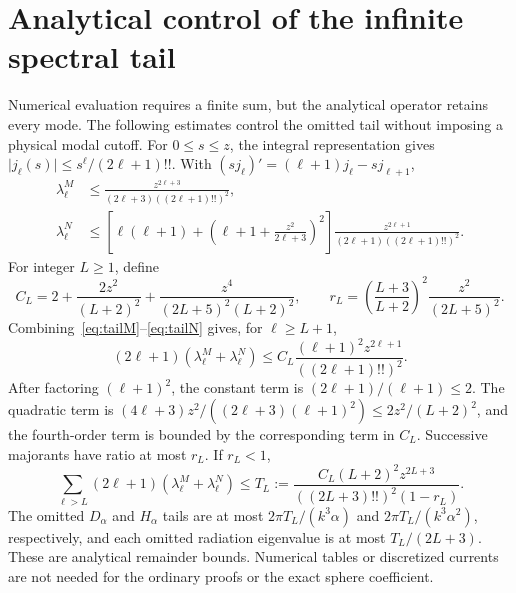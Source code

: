 \documentclass[11pt]{article}
\newcommand{\abs}[1]{\lvert #1\rvert}
\begin{document}
\section{Analytical control of the infinite spectral tail}\label{app:tails}
Numerical evaluation requires a finite sum, but the analytical operator retains every mode. The following estimates control the omitted tail without imposing a physical modal cutoff. For $0\leq s\leq z$, the integral representation gives $\abs{j_\ell(s)}\leq s^\ell/(2\ell+1)!!$. With $(sj_\ell)'=(\ell+1)j_\ell-sj_{\ell+1}$,
\begin{align}
 \lambda^M_\ell&\leq\frac{z^{2\ell+3}}{(2\ell+3)((2\ell+1)!!)^2},\label{eq:tailM}\\
 \lambda^N_\ell&\leq\left[\ell(\ell+1)+
 \left(\ell+1+\frac{z^2}{2\ell+3}\right)^2\right]
 \frac{z^{2\ell+1}}{(2\ell+1)((2\ell+1)!!)^2}.\label{eq:tailN}
\end{align}
For integer $L\geq1$, define
\[
 C_L=2+\frac{2z^2}{(L+2)^2}
       +\frac{z^4}{(2L+5)^2(L+2)^2},\qquad
 r_L=\left(\frac{L+3}{L+2}\right)^2\frac{z^2}{(2L+5)^2}.
\]
Combining~\eqref{eq:tailM}--\eqref{eq:tailN} gives, for $\ell\geq L+1$,
\[
 (2\ell+1)(\lambda^M_\ell+\lambda^N_\ell)
 \leq C_L\frac{(\ell+1)^2z^{2\ell+1}}{((2\ell+1)!!)^2}.
\]
After factoring $(\ell+1)^2$, the constant term is $(2\ell+1)/(\ell+1)\leq2$. The quadratic term is $(4\ell+3)z^2/((2\ell+3)(\ell+1)^2)\leq2z^2/(L+2)^2$, and the fourth-order term is bounded by the corresponding term in $C_L$. Successive majorants have ratio at most $r_L$. If $r_L<1$,
\begin{equation}\label{eq:tail}
 \sum_{\ell>L}(2\ell+1)(\lambda^M_\ell+\lambda^N_\ell)
 \leq T_L:=\frac{C_L(L+2)^2z^{2L+3}}{((2L+3)!!)^2(1-r_L)}.
\end{equation}
The omitted $D_\alpha$ and $H_\alpha$ tails are at most $2\pi T_L/(k^3\alpha)$ and $2\pi T_L/(k^3\alpha^2)$, respectively, and each omitted radiation eigenvalue is at most $T_L/(2L+3)$. These are analytical remainder bounds. Numerical tables or discretized currents are not needed for the ordinary proofs or the exact sphere coefficient.



\end{document}
